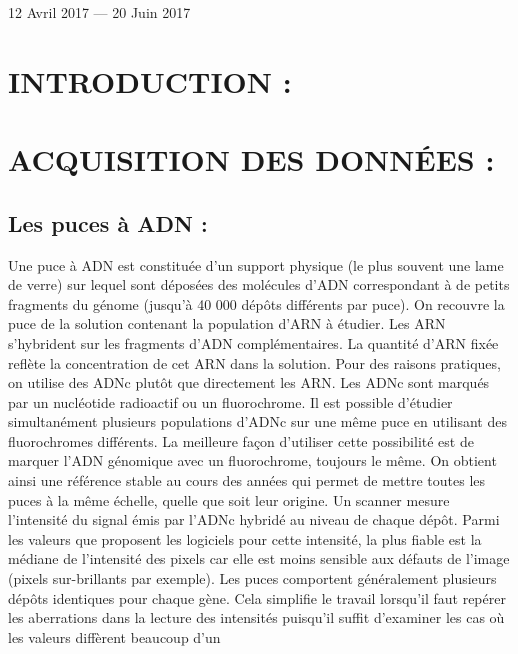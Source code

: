\documentclass[a4paper,10pt]{article}
\begin{document}
\begin{titlepage}
\begin{sffamily}
\begin{center}
    \vfill

    {\large 12 Avril 2017 — 20 Juin 2017}

  \end{center}
  \end{sffamily}
\end{titlepage}
\newpage
\tableofcontents
\newpage
\section{INTRODUCTION :}
\section{ACQUISITION DES DONN\'{E}ES :}
\subsection{Les puces à ADN :}
  Une puce à ADN est constituée d'un support physique (le plus
  souvent une lame de verre) sur lequel sont déposées des molécules
  d'ADN correspondant à de petits fragments du génome (jusqu'à 40 000
  dépôts différents par puce). On recouvre la puce
  de la solution contenant la population d'ARN à étudier. Les ARN
  s'hybrident sur les fragments d'ADN complémentaires. La quantité d'ARN
  fixée reflète la concentration de cet ARN dans la solution.
  \newline
 Pour des raisons pratiques, on utilise des ADNc plutôt que directement
  les ARN. Les ADNc sont marqués par un nucléotide radioactif ou
  un fluorochrome. Il est possible d'étudier simultanément plusieurs
  populations d'ADNc sur une même puce en utilisant des fluorochromes différents.
  La meilleure façon d'utiliser cette possibilité est de marquer
  l'ADN génomique avec un fluorochrome, toujours le même. On
  obtient ainsi une référence stable au cours des années
  qui permet de mettre toutes les puces à la même échelle,
  quelle que soit leur origine. 
  \newline
  Un scanner mesure l'intensité du signal émis par l'ADNc hybridé au niveau de chaque dépôt. Parmi les valeurs que proposent les
  logiciels pour cette intensité, la plus fiable est la médiane de l'intensité des pixels car elle est moins sensible aux défauts de
  l'image (pixels sur-brillants par exemple). 
  \newline
  Les puces comportent généralement plusieurs dépôts identiques pour chaque gène. Cela simplifie le travail lorsqu'il faut
  repérer les aberrations dans la lecture des intensités puisqu'il suffit d'examiner les cas où les valeurs diffèrent beaucoup d'un
\end{document}
